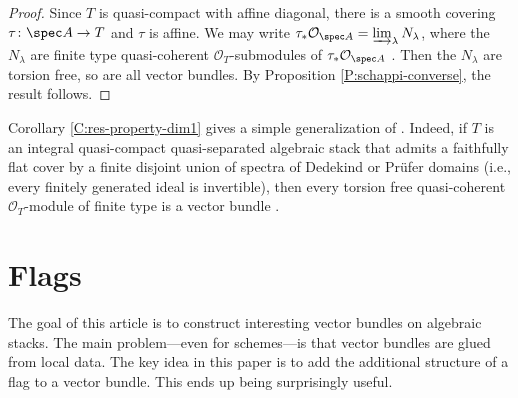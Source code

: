 \documentclass[reqno,a4paper]{amsart}
\numberwithin{Theorem}{section}
\newcommand{\Orb}{\mathcal{O}}
\theoremstyle{plain}
\theoremstyle{remark}
\begin{document}
\begin{proof}
  Since $T$ is quasi-compact with affine diagonal, there is a smooth
  covering $\tau \colon \spec A \to T$ and $\tau$ is affine. We
  may write $\tau_*\Orb_{\spec A} =\varinjlim_\lambda N_\lambda$,
  where the $N_\lambda$ are finite type quasi-coherent
  $\Orb_T$-submodules of $\tau_*\Orb_{\spec A}$ \cite{rydh-2014}.
  Then the $N_\lambda$ are torsion free, so are all vector bundles. By
  Proposition \ref{P:schappi-converse}, the result follows.
\end{proof}
\begin{remark}\label{R:prufer-cover}
  Corollary \ref{C:res-property-dim1} gives a simple generalization of
  \cite[1.4.5]{MR756316}. Indeed, if $T$ is an integral quasi-compact
  quasi-separated algebraic stack that admits a faithfully flat cover
  by a finite disjoint union of spectra of Dedekind or Pr\"ufer
  domains (i.e., every finitely generated ideal is invertible), then
  every torsion free quasi-coherent $\Orb_T$-module of finite type is
  a vector bundle \cite[Thm.~1]{MR46349}.
\end{remark}
\section{Flags} \label{sec:flag} The goal of this article is to construct
interesting vector bundles on algebraic stacks. The main
problem---even for schemes---is that vector bundles
are glued from local data. The key idea in this paper is to add the
additional structure of a flag to a vector bundle. This ends up being surprisingly useful.
\end{document}
